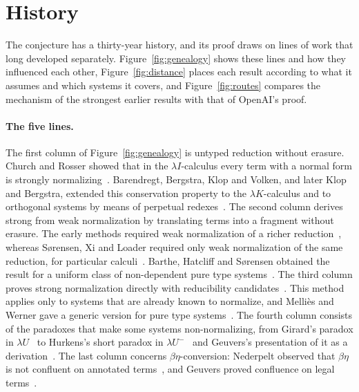\documentclass[10pt]{article}
\begin{document}
\section{History}\label{sec:history}

The conjecture has a thirty-year history, and its proof draws on lines of work that
long developed separately. Figure~\ref{fig:genealogy} shows these lines and how they
influenced each other, Figure~\ref{fig:distance} places each result according to
what it assumes and which systems it covers, and Figure~\ref{fig:routes} compares
the mechanism of the strongest earlier results with that of OpenAI's proof.

\paragraph{The five lines.} The first column of Figure~\ref{fig:genealogy} is
untyped reduction without erasure. Church and Rosser showed that in the
$\lambda I$-calculus every term with a normal form is strongly
normalizing~\cite{ChurchRosser1936}. Barendregt, Bergstra, Klop and Volken, and
later Klop and Bergstra, extended this conservation property to the
$\lambda K$-calculus and to orthogonal systems by means of perpetual
redexes~\cite{BBKV1976,Klop1980,BergstraKlop1982}. The second column derives strong
from weak normalization by translating terms into a fragment without erasure. The
early methods required weak normalization of a richer
reduction~\cite{Nederpelt1973,Klop1980,Karr1985,Khasidashvili1988,deGroote1993,KfouryWells1995},
whereas Sørensen, Xi and Loader required only weak normalization of the same
reduction, for particular calculi~\cite{Sorensen1997IC,Xi1997,Loader1995}. Barthe,
Hatcliff and Sørensen obtained the result for a uniform class of non-dependent pure
type systems~\cite{BHS1999,BartheHatcliffSorensen2001}. The third column proves
strong normalization directly with reducibility
candidates~\cite{Tait1967,Girard1972}. This method applies only to systems that are
already known to normalize, and Melliès and Werner gave a generic version for pure
type systems~\cite{MelliesWerner1998}. The fourth column consists of the paradoxes
that make some systems non-normalizing, from Girard's paradox in
$\lambda U$~\cite{Girard1972} to Hurkens's short paradox in
$\lambda U^-$~\cite{Hurkens1995} and Geuvers's presentation of it as a
derivation~\cite{Geuvers2007}. The last column concerns $\beta\eta$-conversion:
Nederpelt observed that $\beta\eta$ is not confluent on annotated
terms~\cite{Nederpelt1973}, and Geuvers proved confluence on legal
terms~\cite{Geuvers1992,Geuvers1993}.
\end{document}
